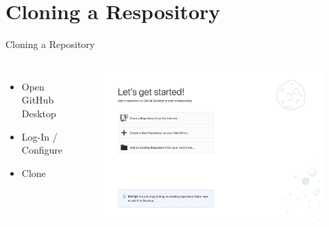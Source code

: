\documentclass{beamer}
\begin{document}
    \section{Cloning a Respository}
    \begin{frame}{Cloning a Repository}
        \begin{columns}
            \begin{itemize}
                \item Open GitHub Desktop
                \item Log-In / Configure
                \item Clone
            \end{itemize}

            \begin{figure}
                \centering
                \includegraphics[width=\textwidth]{figures/clone_1.png}
            \end{figure}
        \end{columns}
    \end{frame}
\end{document}
